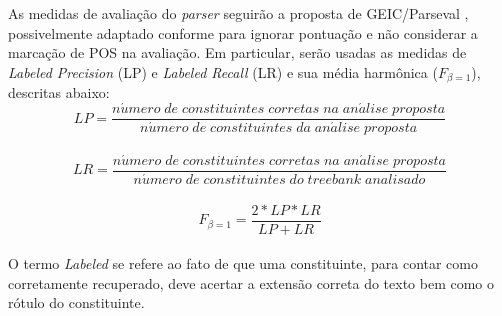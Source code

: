 As medidas de avaliação do \emph{parser} seguirão a proposta de GEIC/Parseval \cite{black91}, possivelmente adaptado conforme \cite{collins97} para ignorar pontuação e não considerar a marcação de POS na avaliação. Em particular, serão usadas as medidas de \emph{Labeled Precision} (LP) e \emph{Labeled Recall} (LR) e sua média harmônica ($F_{\beta=1}$), descritas abaixo:
\\
$$LP = \frac{n\acute{u}mero\; de\; constituintes\; corretas\; na\; an\acute{a}lise\; proposta}{n\acute{u}mero\; de\; constituintes\; da\; an\acute{a}lise\; proposta}$$
\\
$$LR = \frac{n\acute{u}mero\; de\; constituintes\; corretas\; na\; an\acute{a}lise\; proposta}{n\acute{u}mero\; de\; constituintes\; do\; \mathit{treebank}\; analisado}$$
\\
$$F_{\beta=1} = \frac{2*LP*LR}{LP+LR}$$
\\
O termo \emph{Labeled} se refere ao fato de que uma constituinte, para contar como corretamente recuperado, deve acertar a extensão correta do texto bem como o rótulo do constituinte.



